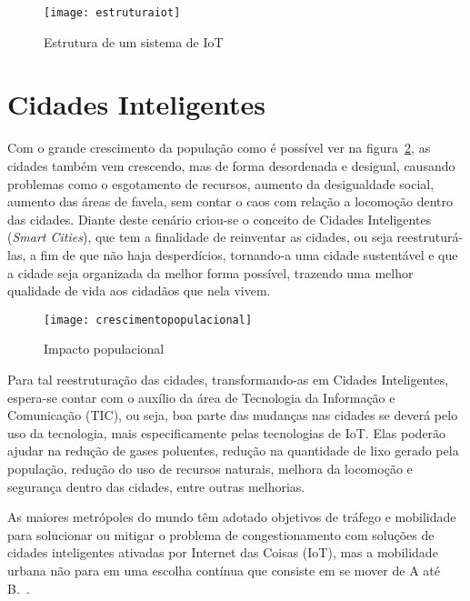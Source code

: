 \begin{figure}[htb]
\caption{\label{fig:estruturaiot} Estrutura de um sistema de IoT}
\begin{center}
\texttt{[image: estruturaiot]}
\end{center}
\end{figure}

\section{Cidades Inteligentes}
\label{sec:smartcities}
Com o grande crescimento da população como é possível ver na figura~\ref{fig:crescimentopopulacional}, as cidades também vem crescendo, mas de forma desordenada e desigual, causando problemas como o esgotamento de recursos, aumento da desigualdade social, aumento das áreas de favela, sem contar o caos com relação a locomoção dentro das cidades. Diante deste cenário criou-se o conceito de Cidades Inteligentes (\textit{Smart Cities}), que tem a finalidade de reinventar as cidades, ou seja reestruturá-las, a fim de que não haja desperdícios, tornando-a uma cidade sustentável e que a cidade seja organizada da melhor forma possível, trazendo uma melhor qualidade de vida aos cidadãos que nela vivem.\cite{leite2012cidades}

\begin{figure}[!h]
\caption{\label{fig:crescimentopopulacional} Impacto populacional}
\begin{center}
\texttt{[image: crescimentopopulacional]}
\end{center}
\end{figure}

Para tal reestruturação das cidades, transformando-as em Cidades Inteligentes, espera-se contar com o auxílio da área de Tecnologia da Informação e Comunicação (TIC), ou seja, boa parte das mudanças nas cidades se deverá pelo uso da tecnologia, mais especificamente pelas tecnologias de IoT. Elas poderão ajudar na redução de gases poluentes, redução na quantidade de lixo gerado pela população, redução do uso de recursos naturais, melhora da locomoção e segurança dentro das cidades, entre outras melhorias.\cite{leite2012cidades} 

\begin{citacao}
As maiores metrópoles do mundo têm adotado objetivos de tráfego e mobilidade para solucionar ou mitigar o problema de congestionamento com soluções de cidades inteligentes ativadas por Internet das Coisas (IoT), mas a mobilidade urbana não para em uma escolha contínua que consiste em se mover de A até B.~\cite[p. 1]{smartcities2017}.
\end{citacao}

